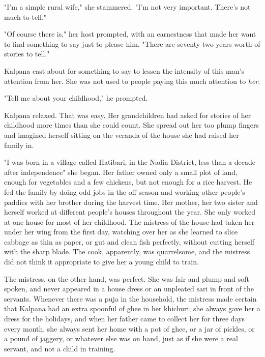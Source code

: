 \documentclass{amsart}
\begin{document}
	"I'm a simple rural wife," she stammered. "I'm not very important. There's not
	much to tell." 
	
	"Of course there is," her host prompted, with an earnestness that made her want
	to find something to say just to please him. "There are seventy two years worth
	of stories to tell."
	
	Kalpana cast about for something to say to lessen the intensity of this man's
	attention from her. She was not used to people paying this much attention to
	\emph{her}.
	
	"Tell me about your childhood," he prompted.
	
	Kalpana relaxed. That was easy. Her grandchildren had asked for stories of her
	childhood more times than she could count. She spread out her too plump fingers
	and imagined herself sitting on the veranda of the house she had raised her
	family in. 
	
	"I was born in a village called Hatibari, in the Nadia District, less than a decade after
	independence" she began. Her
	father owned only a small plot of land, enough for vegetables and a few
	chickens, but not enough for a rice harvest. He fed the family by doing odd jobs
	in the off season and working other people's paddies with her brother during the
	harvest time. Her mother, her two sister and herself worked at different
	people's houses throughout the year. She only worked at one house for most of
	her childhood. The mistress of the house had taken her under her wing from the
	first day, watching over her as she learned to slice cabbage as thin as paper,
	or gut and clean fish perfectly, without cutting herself with the sharp blade.
	The cook, apparently, was quarrelsome, and the mistress did not think it
	appropriate to give her a young child to train. 
	
	The mistress, on the other hand, was perfect. She was fair and plump and soft
	spoken, and never appeared in a house dress or an unpleated sari in front of the
	servants. Whenever there was a puja in the household, the mistress made certain
	that Kalpana had an extra spoonful of ghee in her khichuri; she always gave her
	a dress for the holidays, and when her father came to collect her for three days
	every month, she always sent her home with a pot of ghee, or a jar of pickles,
	or a pound of jaggery, or whatever else was on hand, just as if she were a real
	servant, and not a child in training. 
	
\end{document}

